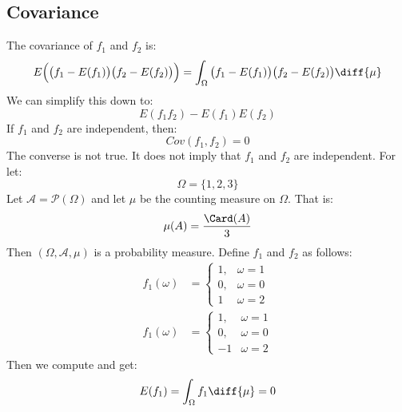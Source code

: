     \subsection{Covariance}
        The covariance of $f_{1}$ and $f_{2}$ is:
        \begin{equation}
            E\Big(\big(f_{1}-E(f_{1})\big)
                \big(f_{2}-E(f_{2})\big)\Big)
            =\int_{\Omega}\big(f_{1}-E(f_{1})\big)
                \big(f_{2}-E(f_{2})\big)\diff{\mu}
        \end{equation}
        We can simplify this down to:
        \begin{equation}
            E(f_{1}f_{2})-E(f_{1})E(f_{2})
        \end{equation}
        If $f_{1}$ and $f_{2}$ are independent, then:
        \begin{equation}
            Cov(f_{1},f_{2})=0
        \end{equation}
        The converse is not true. It does not imply that
        $f_{1}$ and $f_{2}$ are independent.
        For let:
        \begin{equation}
            \Omega=\{1,2,3\}
        \end{equation}
        Let $\mathcal{A}=\mathcal{P}(\Omega)$ and let
        $\mu$ be the counting measure on $\Omega$. That is:
        \begin{equation}
            \mu(A)=\frac{\Card(A)}{3}
        \end{equation}
        Then $(\Omega,\mathcal{A},\mu)$ is a probability
        measure. Define $f_{1}$ and $f_{2}$ as follows:
        \begin{align}
            f_{1}(\omega)&=
            \begin{cases}
                1,&\omega=1\\
                0,&\omega=0\\
                1&\omega=2
            \end{cases}\\
            f_{1}(\omega)&=
            \begin{cases}
                1,&\omega=1\\
                0,&\omega=0\\
                \minus{1}&\omega=2
            \end{cases}
        \end{align}
        Then we compute and get:
        \begin{equation}
            E(f_{1})=\int_{\Omega}f_{1}\diff{\mu}=0
        \end{equation}
